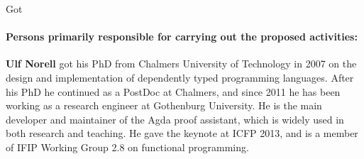 \begin{sitedescription}{Got}
\paragraph*{Persons primarily responsible for carrying out the proposed activities:}

\begin{compactitem}
\item{\bf Ulf Norell} got his PhD from Chalmers University of Technology in
2007 on the design and implementation of dependently typed programming
languages. After his PhD he continued as a PostDoc at Chalmers, and since
2011 he has been working as a research engineer at Gothenburg University.
He is the main developer and maintainer of the Agda proof assistant, which
is widely used in both research and teaching. He gave the keynote at ICFP
2013, and is a member of IFIP Working Group 2.8 on functional programming.
\end{compactitem}

\end{sitedescription}

